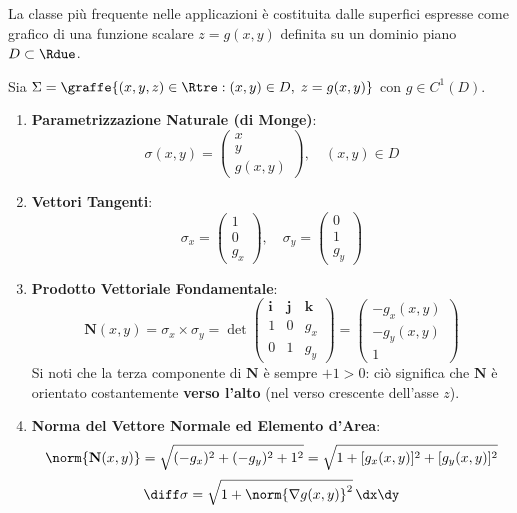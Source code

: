 La classe più frequente nelle applicazioni è costituita dalle superfici espresse come grafico di una funzione scalare $z = g(x,y)$ definita su un dominio piano $D \subset \Rdue$.

\begin{metodo}
Sia $\Sigma = \graffe{(x,y,z) \in \Rtre : (x,y) \in D, \; z = g(x,y)}$ con $g \in C^1(D)$.
\begin{enumerate}
    \item \textbf{Parametrizzazione Naturale (di Monge)}:
    \[
    \sigma(x,y) = \begin{pmatrix} x \\ y \\ g(x,y) \end{pmatrix}, \quad (x,y) \in D
    \]
    \item \textbf{Vettori Tangenti}:
    \[
    \sigma_x = \begin{pmatrix} 1 \\ 0 \\ g_x \end{pmatrix}, \quad \sigma_y = \begin{pmatrix} 0 \\ 1 \\ g_y \end{pmatrix}
    \]
    \item \textbf{Prodotto Vettoriale Fondamentale}:
    \[
    \mathbf{N}(x,y) = \sigma_x \times \sigma_y = \det \begin{pmatrix} \mathbf{i} & \mathbf{j} & \mathbf{k} \\ 1 & 0 & g_x \\ 0 & 1 & g_y \end{pmatrix} = \begin{pmatrix} -g_x(x,y) \\ -g_y(x,y) \\ 1 \end{pmatrix}
    \]
    Si noti che la terza componente di $\mathbf{N}$ è sempre $+1 > 0$: ciò significa che $\mathbf{N}$ è orientato costantemente \textbf{verso l'alto} (nel verso crescente dell'asse $z$).
    \item \textbf{Norma del Vettore Normale ed Elemento d'Area}:
    \[
    \norm{\mathbf{N}(x,y)} = \sqrt{(-g_x)^2 + (-g_y)^2 + 1^2} = \sqrt{1 + [g_x(x,y)]^2 + [g_y(x,y)]^2}
    \]
    \[
    \diff\sigma = \sqrt{1 + \norm{\nabla g(x,y)}^2} \, \dx\dy
    \]
\end{enumerate}
\end{metodo}

